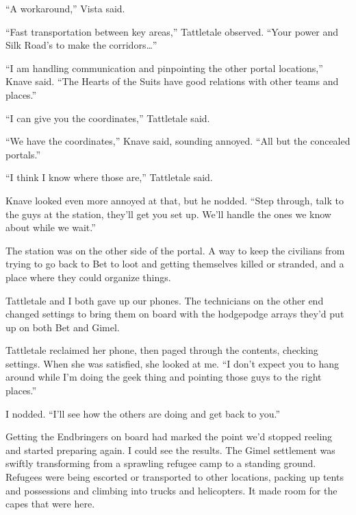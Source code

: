 ``A workaround,'' Vista said.



``Fast transportation between key areas,'' Tattletale observed.  ``Your power and Silk Road's to make the corridors\ldots''



``I am handling communication and pinpointing the other portal locations,'' Knave said.  ``The Hearts of the Suits have good relations with other teams and places.''



``I can give you the coordinates,'' Tattletale said.



``We have the coordinates,'' Knave said, sounding annoyed.  ``All but the concealed portals.''



``I think I know where those are,'' Tattletale said.



Knave looked even more annoyed at that, but he nodded.  ``Step through, talk to the guys at the station, they'll get you set up.  We'll handle the ones we know about while we wait.''



The station was on the other side of the portal.  A way to keep the civilians from trying to go back to Bet to loot and getting themselves killed or stranded, and a place where they could organize things.



Tattletale and I both gave up our phones.  The technicians on the other end changed settings to bring them on board with the hodgepodge arrays they'd put up on both Bet and Gimel.



Tattletale reclaimed her phone, then paged through the contents, checking settings.  When she was satisfied, she looked at me.  ``I don't expect you to hang around while I'm doing the geek thing and pointing those guys to the right places.''



I nodded.  ``I'll see how the others are doing and get back to you.''



Getting the Endbringers on board had marked the point we'd stopped reeling and started preparing again.  I could see the results.  The Gimel settlement was swiftly transforming from a sprawling refugee camp to a standing ground.  Refugees were being escorted or transported to other locations, packing up tents and possessions and climbing into trucks and helicopters.  It made room for the capes that were here.



